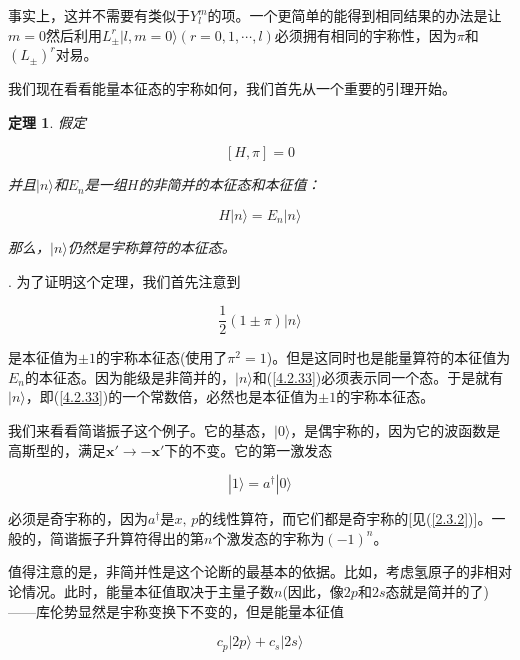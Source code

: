 \documentclass[UTF8,twoside]{ctexart}
\newtheorem{theo}{定理}[section]
\begin{document}
\noindent 事实上，这并不需要有类似于$Y_l^m$的项。一个更简单的能得到相同结果的办法是让$m=0$然后利用$L_{\pm}^r|l, m=0\rangle(r = 0, 1, \cdots, l)$必须拥有相同的宇称性，因为$\pi$和$(L_{\pm})^r$对易。

我们现在看看能量本征态的宇称如何，我们首先从一个重要的引理开始。

\begin{theo}
假定

\begin{equation}
\left[H, \pi\right] = 0
\end{equation}

\noindent 并且$|n\rangle$和$E_n$是一组$H$的非简并的本征态和本征值：

\begin{equation} \label{4.2.32}
H|n\rangle = E_n|n\rangle
\end{equation}

\noindent 那么，$|n\rangle$仍然是宇称算符的本征态。
\end{theo}

. 为了证明这个定理，我们首先注意到

\begin{equation} \label{4.2.33}
\frac{1}{2}(1\pm\pi)|n\rangle
\end{equation}

是本征值为$\pm 1$的宇称本征态(使用了$\pi^2 = 1$)。但是这同时也是能量算符的本征值为$E_n$的本征态。因为能级是非简并的，$|n\rangle$和(\ref{4.2.33})必须表示同一个态。于是就有$|n\rangle$，即(\ref{4.2.33})的一个常数倍，必然也是本征值为$\pm 1$的宇称本征态。

我们来看看简谐振子这个例子。它的基态，$|0\rangle$，是偶宇称的，因为它的波函数是高斯型的，满足$\bm{x}'\rightarrow-\bm{x}'$下的不变。它的第一激发态

\begin{equation}
|1\rangle = a^{\dagger}|0\rangle
\end{equation}

\noindent 必须是奇宇称的，因为$a^{\dagger}$是$x,\, p$的线性算符，而它们都是奇宇称的[见(\ref{2.3.2})]。一般的，简谐振子升算符得出的第$n$个激发态的宇称为$(-1)^n$。

值得注意的是，非简并性是这个论断的最基本的依据。比如，考虑氢原子的非相对论情况。此时，能量本征值取决于主量子数$n$(因此，像$2p$和$2s$态就是简并的了)——库伦势显然是宇称变换下不变的，但是能量本征值

\begin{equation}
c_p|2p\rangle + c_s|2s\rangle
\end{equation}
\end{document}

